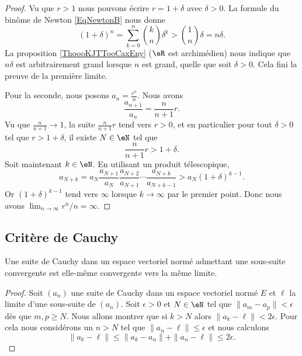 \begin{proof}
    Vu que \( r>1\) nous pouvons écrire \( r=1+\delta\) avec \( \delta>0\). La formule du binôme de Newton \eqref{EqNewtonB} nous donne
    \begin{equation}
        (1+\delta)^n=\sum_{k=0}^n{k\choose n}\delta^k>{1\choose n}\delta=n\delta.
    \end{equation}
    La proposition \ref{ThoooKJTTooCaxEny} (\( \eR\) est archimédien) nous indique que \( n\delta\) est arbitrairement grand lorsque \( n\) est grand, quelle que soit \( \delta>0\). Cela fini la preuve de la première limite.

    Pour la seconde, nous posons \( a_n=\frac{ r^n }{ n }\). Nous avons
    \begin{equation}
        \frac{ a_{n+1} }{ a_n }=\frac{ n }{ n+1 }r.
    \end{equation}
    Vu que \( \frac{ n }{ n+1 }\to 1\), la suite \( \frac{ n }{ n+1 }r\) tend vers \( r>0\), et en particulier pour tout \( \delta>0\) tel que \( r>1+\delta\), il existe \( N\in \eN\) tel que
    \begin{equation}
        \frac{ n }{ n+1 }r>1+\delta.
    \end{equation}
    Soit maintenant \( k\in \eN\). En utilisant un produit télescopique,
    \begin{equation}
        a_{N+k}=a_N\frac{ a_{N+1} }{ a_N }\frac{ a_{N+2} }{ a_{N+1} }\cdots\frac{ a_{N+k} }{ a_{N+k-1} }>a_N(1+\delta)^{k-1}.
    \end{equation}
    Or \( (1+\delta)^{k-1}\) tend vers \( \infty\) lorsque \( k\to \infty\) par le premier point. Donc nous avons \( \lim_{n\to \infty} r^n/n=\infty\).
\end{proof}

\subsection{Critère de Cauchy}

\begin{lemma}
    Une suite de Cauchy dans un espace vectoriel normé admettant une sous-suite convergente est elle-même convergente vers la même limite.
\end{lemma}

\begin{proof}
    Soit \( (a_n)\) une suite de Cauchy dans un espace vectoriel normé \( E\) et \( \ell\) la limite d'une sous-suite de \( (a_n)\). Soit \( \epsilon>0\) et \( N\in \eN\) tel que \( \| a_m-a_p \|<\epsilon\) dès que \( m,p\geq N\). Nous allons montrer que si \( k>N\) alors \( \| a_k-\ell \|<2\epsilon\). Pour cela nous considérons un \( n>N\) tel que \( \| a_n-\ell \|\leq \epsilon\) et nous calculons
    \begin{equation}
        \| a_k-\ell \|\leq \| a_k-a_n \|+\| a_n-\ell \|\leq 2\epsilon.
    \end{equation}
\end{proof}

